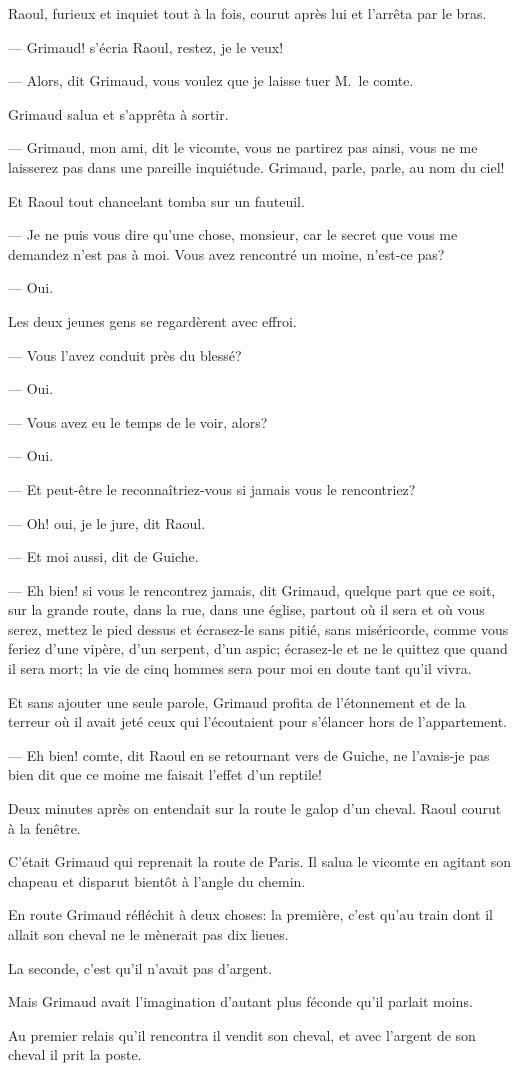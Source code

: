 Raoul, furieux et inquiet tout à la fois, courut après lui et l'arrêta par le bras.

— Grimaud! s'écria Raoul, restez, je le veux!

— Alors, dit Grimaud, vous voulez que je laisse tuer M.~le comte.

Grimaud salua et s'apprêta à sortir.

— Grimaud, mon ami, dit le vicomte, vous ne partirez pas ainsi, vous ne me laisserez pas dans une pareille inquiétude. Grimaud, parle, parle, au nom du ciel!

Et Raoul tout chancelant tomba sur un fauteuil.

— Je ne puis vous dire qu'une chose, monsieur, car le secret que vous me demandez n'est pas à moi. Vous avez rencontré un moine, n'est-ce pas?

— Oui.

Les deux jeunes gens se regardèrent avec effroi.

— Vous l'avez conduit près du blessé?

— Oui.

— Vous avez eu le temps de le voir, alors?

— Oui.

— Et peut-être le reconnaîtriez-vous si jamais vous le rencontriez?

— Oh! oui, je le jure, dit Raoul.

— Et moi aussi, dit de Guiche.

— Eh bien! si vous le rencontrez jamais, dit Grimaud, quelque part que ce soit, sur la grande route, dans la rue, dans une église, partout où il sera et où vous serez, mettez le pied dessus et écrasez-le sans pitié, sans miséricorde, comme vous feriez d'une vipère, d'un serpent, d'un aspic; écrasez-le et ne le quittez que quand il sera mort; la vie de cinq hommes sera pour moi en doute tant qu'il vivra.

Et sans ajouter une seule parole, Grimaud profita de l'étonnement et de la terreur où il avait jeté ceux qui l'écoutaient pour s'élancer hors de l'appartement.

— Eh bien! comte, dit Raoul en se retournant vers de Guiche, ne l'avais-je pas bien dit que ce moine me faisait l'effet d'un reptile!

Deux minutes après on entendait sur la route le galop d'un cheval. Raoul courut à la fenêtre.

C'était Grimaud qui reprenait la route de Paris. Il salua le vicomte en agitant son chapeau et disparut bientôt à l'angle du chemin.

En route Grimaud réfléchit à deux choses: la première, c'est qu'au train dont il allait son cheval ne le mènerait pas dix lieues.

La seconde, c'est qu'il n'avait pas d'argent.

Mais Grimaud avait l'imagination d'autant plus féconde qu'il parlait moins.

Au premier relais qu'il rencontra il vendit son cheval, et avec l'argent de son cheval il prit la poste.